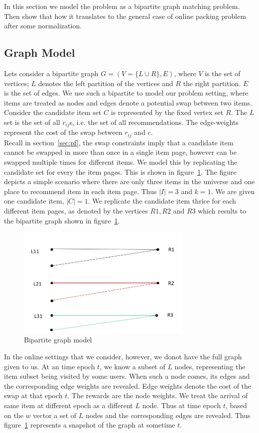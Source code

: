 In this section we model the problem as a bipartite graph matching problem. Then show that how it translates to the general case of online packing problem after some normalization.
\subsection{Graph Model}
Lets consider a bipartite graph $G = (V = \{L \cup R\}, E)$, where $V$ is the set of vertices; $L$ denotes the left partition of the vertices and $R$ the right partition. $E$ is the set of edges. We use such a bipartite to model our problem setting, where items are treated as nodes and edges denote a potential swap between two items. Consider the candidate item set $C$ is represented by the fixed vertex set $R$. The $L$ set is the set of all $r_{ij}$s, i.e. the set of all recommendations. The edge-weights represent the cost of the swap between $r_{ij}$ and $c$.\\
Recall in section~\ref{sec:pf}, the swap constraints imply that a candidate item cannot be swapped in more than once in a single item page, however can be swapped multiple times for different items. We model this by replicating the candidate set for every the item pages. This is shown in figure~\ref{fig:bipartite}. The figure depicts a simple scenario where there are only three items in the universe and one place to recommend item in each item page. Thus $|I| = 3$ and $k=1$. We are given one candidate item, $|C| = 1$. We replicate the candidate item thrice for each different item pages, as denoted by the vertices $R1, R2$ and $R3$ which results to the bipartite graph shown in figure~\ref{fig:bipartite}.\\
\begin{figure}[h]
  \centering
  \includegraphics[width=3.3in]{figs/bipartite.png}
  \caption{Bipartite graph model}
  \label{fig:bipartite}
\end{figure}
In the online settings that we consider, however, we donot have the full graph given to us. At an time epoch $t$, we know a subset of $L$ nodes, representing the item subset being visited by some users. When such a node comes, its edges and the corresponding edge weights are revealed. Edge weights denote the cost of the swap at that epoch $t$. The rewards are the node weights. We treat the arrival of same item at different epoch as a different $L$ node. Thus at time epoch $t$, based on the $w$ vector a set of $L$ nodes and the corresponding edges are revealed. Thus figure~\ref{fig:bipartite} represents a snapshot of the graph at sometime $t$. \\
